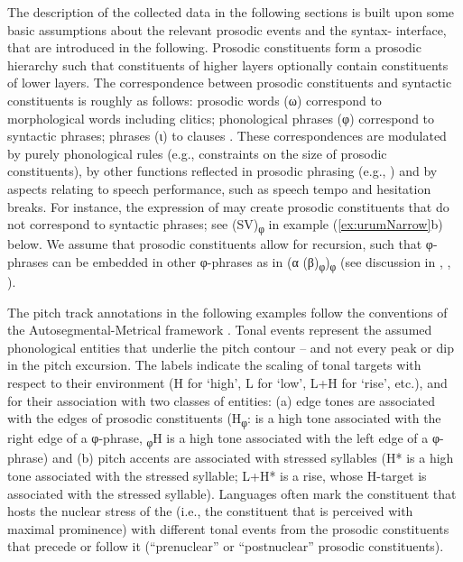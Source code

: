 \documentclass[output=paper,colorlinks,citecolor=brown]{langscibook}
\begin{document}
\begin{sloppypar}
The description of the collected data in the following sections is built upon some basic assumptions about the relevant prosodic events and the syntax- interface, that are introduced in the following. Prosodic constituents form a prosodic hierarchy such that constituents of higher layers optionally contain constituents of lower layers. The correspondence between prosodic constituents and syntactic constituents is roughly as follows: prosodic words (ω) correspond to morphological words including clitics; phonological phrases (φ) correspond to syntactic phrases;  phrases (ι) to clauses \citep[437]{selkirk_syntax-phonology_2011}. These correspondences are modulated by purely phonological rules (e.g., constraints on the size of prosodic constituents), by other functions reflected in prosodic phrasing (e.g., ) and by aspects relating to speech performance, such as speech tempo and hesitation breaks. For instance, the expression of  may create prosodic constituents that do not correspond to syntactic phrases; see (SV)\textsubscript{φ} in example (\ref{ex:urumNarrow}b) below. We assume that prosodic constituents allow for recursion, such that φ-phrases can be embedded in other φ-phrases as in (α (β)\textsubscript{φ})\textsubscript{φ} (see discussion in \citealt[]{ladd_intonational_1986}, \citealt[455]{selkirk_syntax-phonology_2011}, \citealt[78--85]{fery_intonation_2018}).
\end{sloppypar}

The pitch track annotations in the following examples follow the conventions of the Autosegmental-Metrical framework \citep[]{pierrehumbert_phonology_1980}. Tonal events represent the assumed phonological entities that underlie the pitch contour -- and not every peak or dip in the pitch excursion. The labels indicate the scaling of tonal targets with respect to their environment (H for ‘high’, L for ‘low’, L+H for ‘rise’, etc.), and for their association with two classes of entities: (a) edge tones are associated with the edges of prosodic constituents (H\textsubscript{φ}: is a high tone associated with the right edge of a φ-phrase, \textsubscript{φ}H is a high tone associated with the left edge of a φ-phrase) and (b) pitch accents are associated with stressed syllables (H* is a high tone associated with the stressed syllable; L+H* is a rise, whose H-target is associated with the stressed syllable). Languages often mark the constituent that hosts the nuclear stress of the  (i.e., the constituent that is perceived with maximal prominence) with different tonal events from the prosodic constituents that precede or follow it (``prenuclear'' or ``postnuclear'' prosodic constituents).
\end{document}
